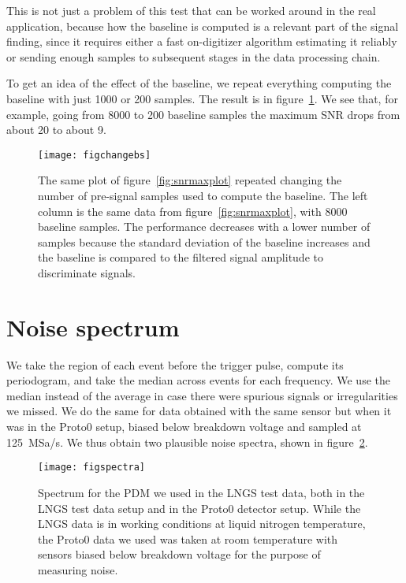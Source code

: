 This is not just a problem of this test that can be worked around in the real
application, because how the baseline is computed is a relevant part of the
signal finding, since it requires either a fast on-digitizer algorithm
estimating it reliably or sending enough samples to subsequent stages in the
data processing chain.

To get an idea of the effect of the baseline, we repeat everything computing
the baseline with just 1000 or 200 samples. The result is in
figure~\ref{fig:changebs}. We see that, for example, going from 8000 to 200
baseline samples the maximum SNR drops from about 20 to about 9.

\begin{figure}
    \hspace{-0.27\textwidth}
    \texttt{[image: figchangebs]}
    
    \caption{The same plot of figure~\ref{fig:snrmaxplot} repeated changing the
    number of pre-signal samples used to compute the baseline. The left column
    is the same data from figure~\ref{fig:snrmaxplot}, with 8000 baseline
    samples. The performance decreases with a lower number of samples because
    the standard deviation of the baseline increases and the baseline is
    compared to the filtered signal amplitude to discriminate signals.}
    
    \label{fig:changebs}
\end{figure}

\section{Noise spectrum}
\label{sec:spectrum}

We take the region of each event before the trigger pulse, compute its
periodogram, and take the median across events for each frequency. We use the
median instead of the average in case there were spurious signals or
irregularities we missed. We do the same for data obtained with the same sensor
but when it was in the Proto0 setup, biased below breakdown voltage and sampled
at \SI{125}{MSa/s}. We thus obtain two plausible noise spectra, shown in
figure~\ref{fig:spectra}. 

\begin{figure}
    \hspace{-0.28\textwidth}
    \texttt{[image: figspectra]}
    
    \caption{Spectrum for the PDM we used in the LNGS test data, both in the
    LNGS test data setup and in the Proto0 detector setup. While the LNGS data
    is in working conditions at liquid nitrogen temperature, the Proto0 data we
    used was taken at room temperature with sensors biased below breakdown
    voltage for the purpose of measuring noise.}
    
    \label{fig:spectra}
\end{figure}

